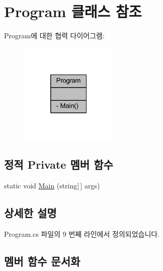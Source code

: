 \hypertarget{class_comet_engine_tester_1_1_program}{}\section{Program 클래스 참조}
\label{class_comet_engine_tester_1_1_program}


Program에 대한 협력 다이어그램\+:\nopagebreak
\begin{figure}[H]
\begin{center}
\leavevmode
\includegraphics[width=133pt]{class_comet_engine_tester_1_1_program__coll__graph}
\end{center}
\end{figure}
\subsection*{정적 Private 멤버 함수}
\begin{DoxyCompactItemize}
\item 
static void \hyperlink{class_comet_engine_tester_1_1_program_a25f94f55e8993781b6a82d5eb88ea252}{Main} (string\mbox{[}$\,$\mbox{]} args)
\end{DoxyCompactItemize}


\subsection{상세한 설명}


Program.\+cs 파일의 9 번째 라인에서 정의되었습니다.



\subsection{멤버 함수 문서화}
\mbox{\label{class_comet_engine_tester_1_1_program_a25f94f55e8993781b6a82d5eb88ea252}} 
